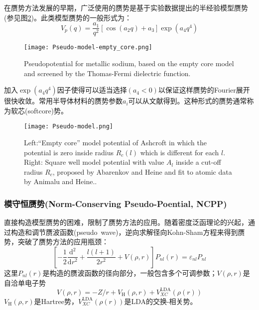 在赝势方法发展的早期，广泛使用的赝势是基于实验数据提出的半经验模型赝势\cite{PM9-451_1964,PM12-529_1965,JPF2-270_1972,PRB11-2717_1975,PRB11-2726_1975,JPF6-L271_1976,PR174-769_1968}(参见图\ref{Pseudo-model})。此类模型赝势的一般形式为：
\begin{equation}
  V_p(q)=\frac{a_1}{q^2}[\cos(a_2q)+a_3]\exp(a_4q^4)
  \label{eq:solid-102}
\end{equation}
\begin{figure}[h!]
\centering
\texttt{[image: Pseudo-model-empty\_core.png]}
\caption{\small \textrm{Pseudopotential for metallic sodium, based on the empty core model and screened by the Thomas-Fermi dielectric function.}}%
\label{Pseudo_model-empty_core}
\end{figure}
加入$\exp(a_4q^4)$因子使得可以适当选择$(a_4<0)$以保证这样赝势的Fourier展开很快收敛。常用半导体材料的赝势参数$a_i$可以从文献得到。这种形式的赝势通常称为软芯(softcore)势。%
\begin{figure}[h!]
\centering
\texttt{[image: Pseudo-model.png]}
\caption{\small \textrm{Left:``Empty core'' model potential of Ashcroft in which the potential is zero inside radius $R_c(l)$ which is different for each $l$. Right: Square well model potential with value $A_l$ inside a cut-off radius $R_c$, proposed by Abarenkov and Heine and fit to atomic data by Animalu and Heine..}}%
\label{Pseudo-model}
\end{figure}

\subsubsection{模守恒赝势\textrm(Norm-Conserving Pseudo-Poential, NCPP)}
直接构造模型赝势的困难，限制了赝势方法的应用。随着密度泛函理论的兴起，通过构造和调节赝波函数(pseudo~wave)，逆向求解径向Kohn-Sham方程来得到赝势，突破了赝势方法的应用瓶颈：
\begin{equation}
	\left[-\frac12\frac{\mathrm{d}^2}{\mathrm{d}r^2}+\frac{l(l+1)}{2r^2}+V(\rho,r)\right]P_{nl}(r)=\varepsilon_{nl}P_{nl}
  \label{eq:solid-103}
\end{equation}
这里$P_{nl}(r)$是构造的赝波函数的径向部分，一般包含多个可调参数；$V(\rho,r)$是自洽单电子势$$V(\rho,r)=-Z/r+V_{\mathrm{H}}(\rho,r)+V_{XC}^{\mathrm{LDA}}(\rho(r))$$
$V_{\mathrm{H}}(\rho,r)$是Hartree势，$V_{XC}^{\mathrm{LDA}}(\rho(r))$是LDA的交换-相关势。

